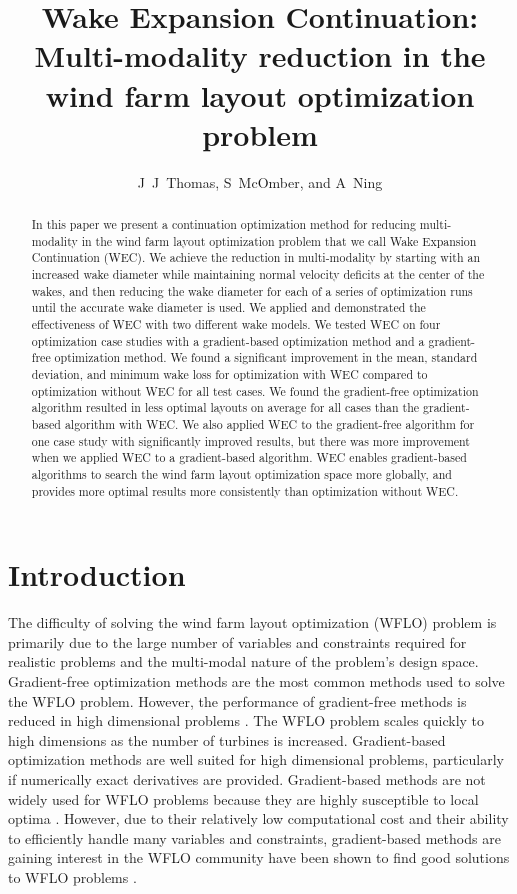 \documentclass{jpconf}
\begin{document}
\setcounter{page}{1}

\title{Wake Expansion Continuation: \large{Multi-modality reduction in the wind farm layout optimization problem}}

\author{J~J~Thomas, S~McOmber, and A~Ning}
\address{Department of Mechanical Engineering,
Brigham Young University, Provo, Utah, USA}

\begin{abstract}
	In this paper we present a continuation optimization method for reducing multi-modality in the wind farm layout optimization problem that we call Wake Expansion Continuation (WEC). We achieve the reduction in multi-modality by starting with an increased wake diameter while maintaining normal velocity deficits at the center of the wakes, and then reducing the wake diameter for each of a series of optimization runs until the accurate wake diameter is used. We applied and demonstrated the effectiveness of WEC with two different wake models. We tested WEC on four optimization case studies with a gradient-based optimization method and a gradient-free optimization method. We found a significant improvement in the mean, standard deviation, and minimum wake loss for optimization with WEC compared to optimization without WEC for all test cases. We found the gradient-free optimization algorithm resulted in less optimal layouts on average for all cases than the gradient-based algorithm with WEC. We also applied WEC to the gradient-free algorithm for one case study with significantly improved results, but there was more improvement when we applied WEC to a gradient-based algorithm. WEC enables gradient-based algorithms to search the wind farm layout optimization space more globally, and provides more optimal results more consistently than optimization without WEC.
\end{abstract}


\section{Introduction}

The difficulty of solving the wind farm layout optimization (WFLO) problem is primarily due to the large number of variables and constraints required for realistic problems and the multi-modal nature of the problem's design space. Gradient-free optimization methods are the most common methods used to solve the WFLO problem. However, the performance of gradient-free methods is reduced in high dimensional problems \cite{rios2013-grad-free-comparison}. The WFLO problem scales quickly to high dimensions as the number of turbines is increased. Gradient-based optimization methods are well suited for high dimensional problems, particularly if numerically exact derivatives are provided. Gradient-based methods are not widely used for WFLO problems because they are highly susceptible to local optima \cite{acero2014}. However, due to their relatively low computational cost and their ability to efficiently handle many variables and constraints, gradient-based methods are gaining interest in the WFLO community have been shown to find good solutions to WFLO problems \cite{fleming2015,guirguis2016,gebraad2017-Maximization-Annual,baker2019,thomas2019-les-validation}.  
\end{document}
